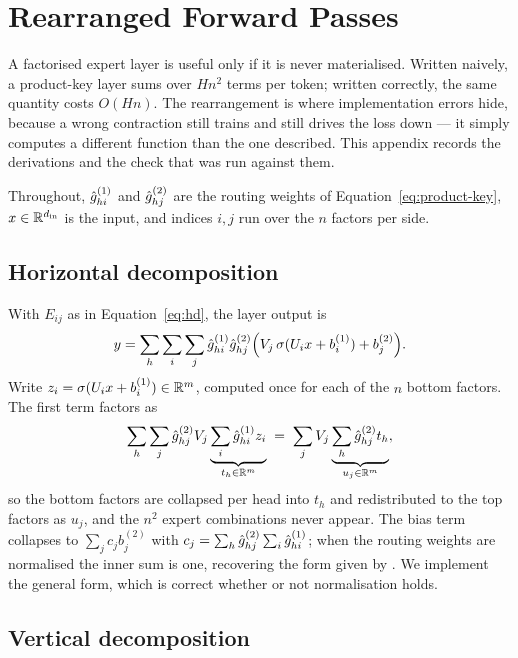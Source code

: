 \section{Rearranged Forward Passes}
\label{app:forward}

A factorised expert layer is useful only if it is never materialised. Written
naively, a product-key layer sums over $H n^2$ terms per token; written
correctly, the same quantity costs $O(H n)$. The rearrangement is where
implementation errors hide, because a wrong contraction still trains and still
drives the loss down --- it simply computes a different function than the one
described. This appendix records the derivations and the check that was run
against them.

Throughout, $\hat{g}^{(1)}_{hi}$ and $\hat{g}^{(2)}_{hj}$ are the routing weights
of Equation~\eqref{eq:product-key}, $x \in \mathbb{R}^{d_{\mathrm{in}}}$ is the input,
and indices $i,j$ run over the $n$ factors per side.

\subsection{Horizontal decomposition}

With $E_{ij}$ as in Equation~\eqref{eq:hd}, the layer output is
\begin{equation}
  y = \sum_{h} \sum_{i} \sum_{j}
      \hat{g}^{(1)}_{hi}\hat{g}^{(2)}_{hj}
      \Big( V_j\, \sigma(U_i x + b^{(1)}_i) + b^{(2)}_j \Big).
\end{equation}
Write $z_i = \sigma(U_i x + b^{(1)}_i) \in \mathbb{R}^{m}$, computed once for each of
the $n$ bottom factors. The first term factors as
\begin{equation}
  \sum_{h}\sum_{j} \hat{g}^{(2)}_{hj} V_j
  \underbrace{\sum_{i} \hat{g}^{(1)}_{hi} z_i}_{t_h \in \mathbb{R}^{m}}
  \;=\;
  \sum_{j} V_j \underbrace{\sum_{h} \hat{g}^{(2)}_{hj} t_h}_{u_j \in \mathbb{R}^{m}},
\end{equation}
so the bottom factors are collapsed per head into $t_h$ and redistributed to
the top factors as $u_j$, and the $n^2$ expert combinations never appear. The
bias term collapses to $\sum_j c_j b^{(2)}_j$ with $c_j = \sum_h
\hat{g}^{(2)}_{hj}\sum_i \hat{g}^{(1)}_{hi}$; when the routing weights are
normalised the inner sum is one, recovering the form given by
\citet{park2025monet}. We implement the general form, which is correct whether
or not normalisation holds.

\subsection{Vertical decomposition}

